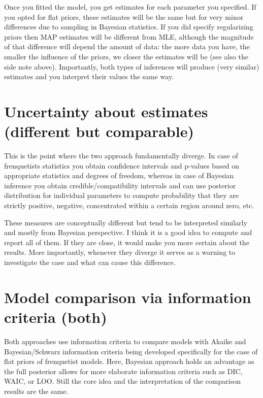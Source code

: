 \documentclass[
]{book}
\begin{document}
Once you fitted the model, you get estimates for each parameter you specified. If you opted for flat priors, these estimates will be the same but for very minor differences due to sampling in Bayesian statistics. If you did specify regularizing priors then MAP estimates will be different from MLE, although the magnitude of that difference will depend the amount of data: the more data you have, the smaller the influence of the priors, we closer the estimates will be (see also the side note above). Importantly, both types of inferences will produce (very similar) estimates and you interpret their values the same way.

\hypertarget{uncertainty-about-estimates-different-but-comparable}{%
\section{Uncertainty about estimates (different but comparable)}\label{uncertainty-about-estimates-different-but-comparable}}

This is the point where the two approach fundamentally diverge. In case of frenquetists statistics you obtain confidence intervals and p-values based on appropriate statistics and degrees of freedom, whereas in case of Bayesian inference you obtain credible/compatibility intervals and can use posterior distribution for individual parameters to compute probability that they are strictly positive, negative, concentrated within a certain region around zero, etc.

These measures are conceptually different but tend to be interpreted similarly and mostly from Bayesian perspective. I think it is a good idea to compute and report all of them. If they are close, it would make you more certain about the results. More importantly, whenever they diverge it serves as a warning to investigate the case and what can cause this difference.

\hypertarget{model-comparison-via-information-criteria-both}{%
\section{Model comparison via information criteria (both)}\label{model-comparison-via-information-criteria-both}}

Both approaches use information criteria to compare models with Akaike and Bayesian/Schwarz information criteria being developed specifically for the case of flat priors of frenquetist models. Here, Bayesian approach holds an advantage as the full posterior allows for more elaborate information criteria such as DIC, WAIC, or LOO. Still the core idea and the interpretation of the comparison results are the same.
\end{document}
